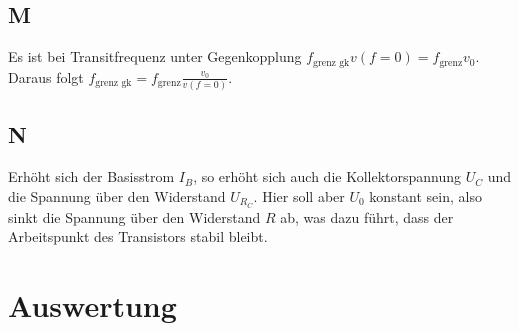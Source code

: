 \documentclass[a4paper,12pt]{article}
\numberwithin{equation}{section}
\begin{document}
\subsection{M}
Es ist bei Transitfrequenz unter Gegenkopplung $f_\text{grenz gk}v\left(f=0\right)=f_\text{grenz}v_0$.
Daraus folgt $f_\text{grenz gk}=f_\text{grenz}\tfrac{v_0}{v\left(f=0\right)}$.

\subsection{N}
Erhöht sich der Basisstrom $I_B$, so erhöht sich auch die Kollektorspannung $U_C$ und die Spannung über den Widerstand $U_{R_C}$.
Hier soll aber $U_0$ konstant sein, also sinkt die Spannung über den Widerstand $R$ ab, was dazu führt, dass der Arbeitspunkt des Transistors stabil bleibt.

\clearpage
\section{Auswertung}

\clearpage
\listoffigures
\listoftables



\end{document}
